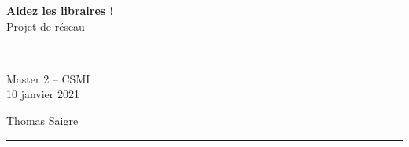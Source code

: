\documentclass[10pt,a4paper]{article}
\begin{document}
\thispagestyle{plain}




\begin{center}

\begin{Large}
\textbf{\textsf{Aidez les libraires !}}\\
\textsf{Projet de réseau}
\end{Large}\\
\begin{large}
    \textsf{Master 2 -- CSMI}\\
    \textsf{10 janvier 2021}
\end{large}

\vspace{1.5\baselineskip}
{\sf Thomas Saigre}


\vspace{1.5\baselineskip}
\hrule

\end{center}
\end{document}
